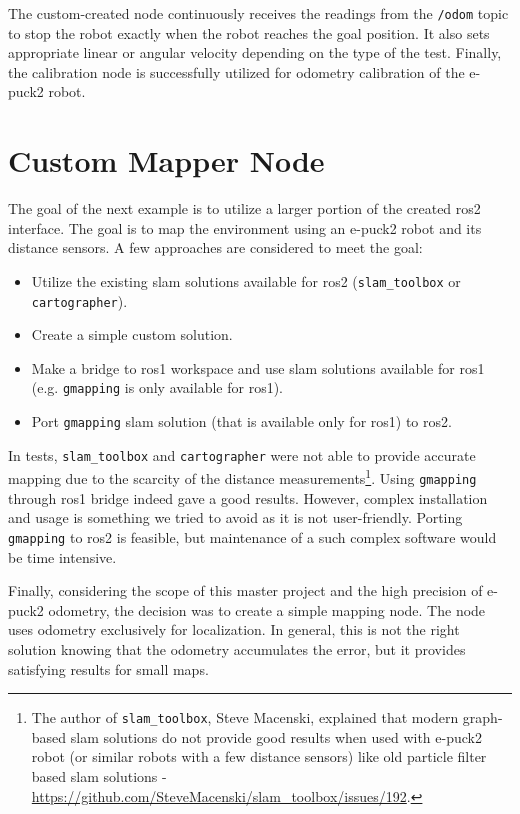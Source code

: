 The custom-created node continuously receives the readings from the \texttt{/odom} topic to stop the robot exactly when the robot reaches the goal position.
It also sets appropriate linear or angular velocity depending on the type of the test.
Finally, the calibration node is successfully utilized for odometry calibration of the e-puck2 robot.

\section{Custom Mapper Node}
\label{sec:demos:mapping}

The goal of the next example is to utilize a larger portion of the created \ac{ros2} interface.
The goal is to map the environment using an e-puck2 robot and its distance sensors.
A few approaches are considered to meet the goal:
\begin{itemize}
    \item Utilize the existing \ac{slam} solutions available for \ac{ros2} (\texttt{slam\_toolbox} or \texttt{cartographer}).
    \item Create a simple custom solution.
    \item Make a bridge to \ac{ros}1 workspace and use \ac{slam} solutions available for \ac{ros}1 (e.g. \texttt{gmapping} is only available for \ac{ros}1).
    \item Port \texttt{gmapping} \ac{slam} solution (that is available only for \ac{ros}1) to \ac{ros2}.
\end{itemize}

In tests, \texttt{slam\_toolbox} and \texttt{cartographer} were not able to provide accurate mapping due to the scarcity of the distance measurements\footnote{The author of \texttt{slam\_toolbox}, Steve Macenski, explained that modern graph-based \ac{slam} solutions do not provide good results when used with e-puck2 robot (or similar robots with a few distance sensors) like old particle filter based \ac{slam} solutions - \url{https://github.com/SteveMacenski/slam_toolbox/issues/192}.}. Using \texttt{gmapping} through \ac{ros}1 bridge indeed gave a good results.
However, complex installation and usage is something we tried to avoid as it is not user-friendly.
Porting \texttt{gmapping} to \ac{ros2} is feasible, but maintenance of a such complex software would be time intensive.

Finally, considering the scope of this master project and the high precision of e-puck2 odometry, the decision was to create a simple mapping node.
The node uses odometry exclusively for localization.
In general, this is not the right solution knowing that the odometry accumulates the error, but it provides satisfying results for small maps. 

